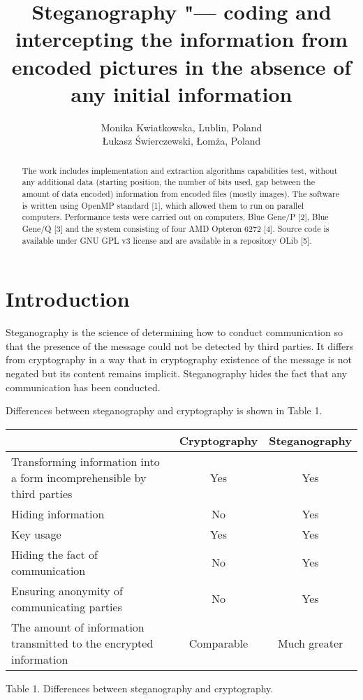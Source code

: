 \documentclass[10pt, a5paper]{article}
\begin{document}
\title{Steganography "--- coding and intercepting the information from encoded pictures in the absence of any initial information}
\author{Monika Kwiatkowska, Lublin, Poland\\ \L{}ukasz \'S{}wierczewski, \L{}om\.z{}a, Poland}
\maketitle
\begin{abstract}
The work includes implementation and extraction algorithms capabilities test, without any additional data (starting position, the number of bits used, gap between the amount of data encoded) information from encoded files (mostly images). The software is written using OpenMP standard [1], which allowed them to run on parallel computers. Performance tests were carried out on computers, Blue Gene/P [2], Blue Gene/Q [3] and the system consisting of four AMD Opteron 6272 [4]. Source code is available under GNU GPL v3 license and are available in a repository OLib [5].
\end{abstract}
\section{Introduction}

Steganography is the science of determining how to conduct communication so that the presence of the message could not be detected by third parties. It differs from cryptography in a way that in cryptography existence of the message is not negated but its content remains implicit. Steganography hides the fact that any communication has been conducted.

Differences between steganography and cryptography is shown in Table 1.

\begin{center}
\begin{tabular}{P{13em}|c|c}
\hline
                                                                            & Cryptography & Steganography \\
\hline
Transforming information into a form in\-compre\-hensible by third parties  &     Yes      &     Yes       \\
Hiding information                                                          &     No       &     Yes       \\
Key usage                                                                   &     Yes      &     Yes       \\
Hiding the fact of commu\-ni\-ca\-tion                                      &     No       &     Yes       \\
Ensuring anonymity of commu\-ni\-ca\-ting parties                           &     No       &     Yes       \\
The amount of information transmitted to the encrypted information          &  Comparable  &  Much greater \\
\hline
\end{tabular}

Table 1. Differences between steganography and cryptography.
\end{center}
\end{document}

